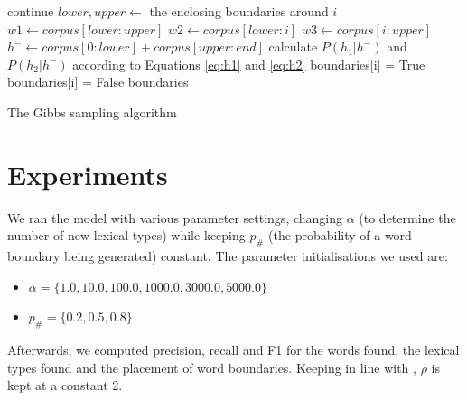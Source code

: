 \documentclass[11pt]{article}
\begin{document}
\begin{algorithm}
    \begin{algorithmic}
        \For{$i \in$ $[0, |corpus|)$}
            \State continue 
        \EndIf
        \State $lower, upper \gets $ the enclosing boundaries around $i$
        \State $w1 \gets corpus[lower:upper]$ 
        \State $w2 \gets corpus[lower:i]$
        \State $w3 \gets corpus[i:upper]$
        \State $h^{-} \gets corpus[0:lower] + corpus[upper:end]$ 
        \State
        \State calculate $P(h_1 | h^-)$ and $P(h_2 | h^-)$ according to
               Equations \ref{eq:h1} and \ref{eq:h2}
        \State
          \State boundaries[i] = True
        \Else
          \State boundaries[i] = False
        \EndIf
        \EndFor
        \Return boundaries
    \EndFunction
    \end{algorithmic}
    \caption{The Gibbs sampling algorithm}
    \label{algo:gibbs}
\end{algorithm}

\FloatBarrier
\section{Experiments}
We ran the model with various parameter settings, changing $\alpha$ (to determine the number of new lexical types) while keeping $p_\#$ (the probability of a word boundary being generated) constant. The parameter initialisations we used are:
\begin{itemize}
\item $\alpha = \{1.0, 10.0, 100.0, 1000.0, 3000.0, 5000.0\}$
\item $p_\# = \{0.2, 0.5, 0.8\}$
\end{itemize}
Afterwards, we computed precision, recall and F1 for the words found, the
lexical types found and the placement of word boundaries. Keeping in line with
\cite{goldwater2009}, $\rho$ is kept at a constant 2.
\end{document}

